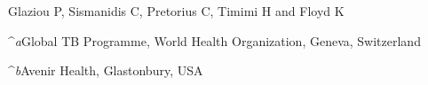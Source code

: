 Glaziou P, Sismanidis C, Pretorius C, Timimi H and Floyd K

^\textit{a}Global TB Programme, World Health Organization, Geneva, Switzerland

^\textit{b}Avenir Health, Glastonbury, USA